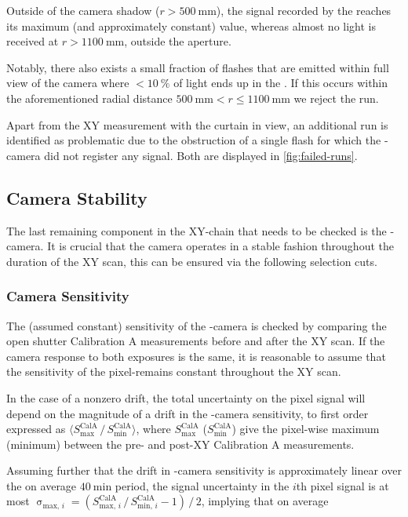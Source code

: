 Outside of the camera shadow ($r>\SI{500}{\milli\meter}$), the signal recorded 
by the \FD reaches its maximum (and approximately constant) value, whereas 
almost no light is received at $r>\SI{1100}{\milli\meter}$, outside the \FD 
aperture.

Notably, there also exists a small fraction of flashes that are emitted within
full view of the camera where $<\SI{10}{\percent}$ of light ends up in the \FD.
If this occurs within the aforementioned radial distance 
$\SI{500}{\milli\meter}<r\leq\SI{1100}{\milli\meter}$ we reject the run.

Apart from the XY measurement with the curtain in view, an additional run is 
identified as problematic due to the obstruction of a single flash for which the
\FD-camera did not register any signal. Both are displayed in
\cref{fig:failed-runs}.

\subsection{Camera Stability}

The last remaining component in the XY-\DAQ chain that needs to be checked is the
\FD-camera. It is crucial that the camera operates in a stable fashion throughout 
the duration of the XY scan, this can be ensured via the following selection cuts.

\subsubsection{Camera Sensitivity}
\label{sssec:xy-qa-camera-sensitivity}

The (assumed constant) sensitivity of the \FD-camera is checked by comparing the
open shutter Calibration A measurements before and after the XY scan. If the 
camera response to both exposures is the same, it is reasonable to assume that 
the sensitivity of the pixel-\PMTs remains constant throughout the XY scan. 

In the case of a nonzero drift, the total uncertainty on the pixel signal will 
depend on the magnitude of a drift in the \FD-camera sensitivity, to first order
expressed as 
$\langle S^\mathrm{CalA}_\mathrm{max}\,/\,S^\mathrm{CalA}_\mathrm{min}\rangle$, 
where $S^\mathrm{CalA}_\mathrm{max}$ ($S^\mathrm{CalA}_\mathrm{min}$) give the
pixel-wise maximum (minimum) between the pre- and post-XY Calibration A 
measurements. 

Assuming further that the drift in \FD-camera sensitivity is approximately 
linear over the on average $\SI{40}{\minute}$ \DAQ period, the signal 
uncertainty in the $i$th pixel signal is at most 
$\upsigma_{\mathrm{max},\,i}=(S^\mathrm{CalA}_{\mathrm{max},\,i}\, / 
\,S^\mathrm{CalA}_{\mathrm{min},\,i} - 1)\,/\,2$, implying that on average

